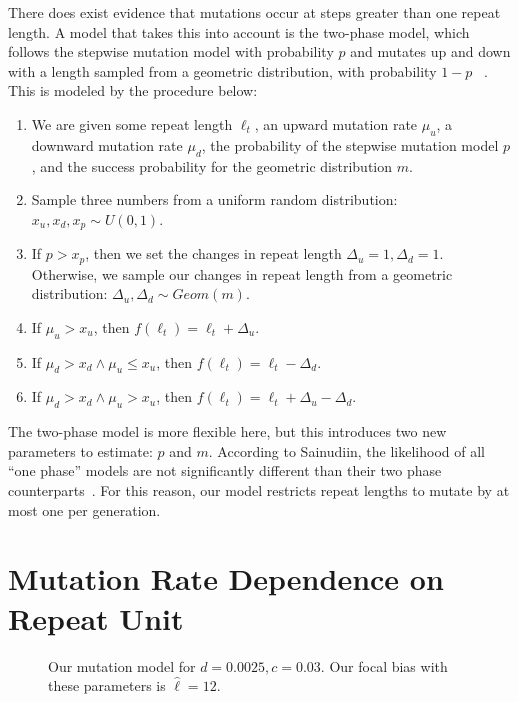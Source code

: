 There does exist evidence that mutations occur at steps greater than one repeat length.
A model that takes this into account is the two-phase model, which follows the stepwise mutation model with probability
$p$ and mutates up and down with a length sampled from a geometric distribution, with probability $1-p$
~\cite{dirienzoMutationalProcessesSimplesequence1994}.
This is modeled by the procedure below:
\begin{enumerate}
    \item We are given some repeat length $\ell_t$, an upward mutation rate $\mu_u$, a
        downward mutation rate $\mu_d$, the probability of the stepwise mutation model $p$, and the success probability
        for the geometric distribution $m$.
    \item Sample three numbers from a uniform random distribution: $x_u, x_d, x_p \sim U(0, 1)$.
    \item If $p > x_p$, then we set the changes in repeat length $\Delta_u = 1, \Delta_d = 1$.
        Otherwise, we sample our changes in repeat length from a geometric distribution:
        $\Delta_u, \Delta_d \sim \mathit{Geom}(m)$.
    \item If $\mu_u > x_u$, then $f(\ell_{t}) = \ell_t + \Delta_u$.
    \item If $\mu_d > x_d \land \mu_u \leq x_u$, then $f(\ell_{t}) = \ell_t - \Delta_d$.
    \item If $\mu_d > x_d \land \mu_u > x_u$, then $f(\ell_{t}) = \ell_{t} + \Delta_u - \Delta_d$.
\end{enumerate}

The two-phase model is more flexible here, but this introduces two new parameters to estimate: $p$ and $m$.
According to Sainudiin, the likelihood of all ``one phase'' models are
not significantly different than their two phase counterparts~\cite{sainudiinMicrosatelliteMutationModels2004}.
For this reason, our model restricts repeat lengths to mutate by at most one per generation.

\section{Mutation Rate Dependence on Repeat Unit}\label{sec:mutationRateDependenceOnRepeatUnit}
\begin{figure}[t]
    \centering{}
    \caption{Our mutation model for $d=0.0025, c=0.03$.
    Our focal bias with these parameters is $\hat{\ell}=12$.}\label{fig:mutationModel}
\end{figure}

